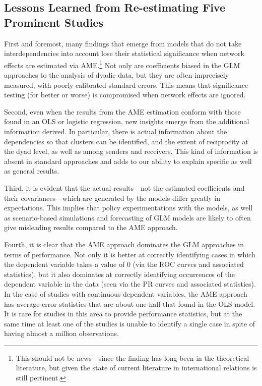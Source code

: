 \documentclass{article}[12pt]
\begin{document}
\subsection{Lessons Learned from Re-estimating Five Prominent Studies}

First and foremost, many findings that emerge from models that do not take interdependencies into account lose their statistical significance when network effects are estimated via AME.\footnote{This should not be news---since the finding has long been in the theoretical literature, but given the state of current literature in international relations is still pertinent.} Not only are coefficients biased in the GLM approaches to the analysis of dyadic data, but they are often imprecisely measured, with poorly calibrated standard errors.  This means that significance testing (for better or worse) is compromised when network effects are ignored.

Second, even when the results from the AME estimation conform with those found in an OLS or logistic regression, new insights emerge from the additional information derived. In particular, there is actual information about the dependencies so that clusters can be identified, and the extent of reciprocity at the dyad level, as well as among senders and receivers.  This kind of information is absent in standard approaches and adds to our ability to explain specific as well as general results.

Third, it is evident that the actual results---not the estimated coefficients and their covariances---which are generated by the models differ greatly in expectations.  This implies that policy experimentations with the models, as well as scenario-based simulations and forecasting of GLM models are likely to often give misleading results compared to the AME approach.

Fourth, it is clear that the AME approach dominates the GLM approaches in terms of performance. Not only it is better at correctly identifying cases in which the dependent variable takes a value of $0$ (via the ROC curves and associated statistics), but it also dominates at correctly identifying occurrences of the dependent variable in the data (seen via the PR curves and associated statistics).  In the case of studies with continuous dependent variables, the AME approach has average error statistics that are about one-half that found in the OLS model. It is rare for studies in this area to provide performance statistics, but at the same time at least one of the studies is unable to identify a single case in spite of having almost a million observations.
\end{document}
